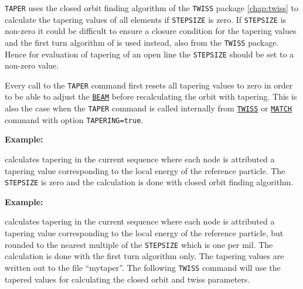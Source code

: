 \texttt{TAPER} uses the closed orbit finding algorithm of the
\texttt{TWISS} package \ref{chap:twiss} to calculate the
tapering values of all elements if \texttt{STEPSIZE} is zero.
If \texttt{STEPSIZE} is non-zero it could be difficult to ensure a
closure condition for the tapering values and the first turn algorithm
of \madx is used instead, also from the \texttt{TWISS} package. Hence
for evaluation of tapering of an open line the \texttt{STEPSIZE} should
be set to a non-zero value.  

Every call to the \texttt{TAPER} command first resets all tapering
values to zero in order to be able to adjust the
\hyperref[chap:beam]{\texttt{BEAM}} before recalculating the orbit with
tapering. This is also the case when the \texttt{TAPER} command is
called internally from \hyperref[chap:twiss]{\texttt{TWISS}} or
\hyperref[chap:match]{\texttt{MATCH}} command with option
\texttt{TAPERING=true}.  

\textbf{Example:}

calculates tapering in the current sequence where each node is
attributed a tapering value corresponding to the local energy of the
reference particle. The \texttt{STEPSIZE} is zero and the calculation is
done with closed orbit finding algorithm.


\textbf{Example:}

calculates tapering in the current sequence where each node is
attributed a tapering value corresponding to the local energy of the
reference particle, but rounded to the nearest multiple of the
\texttt{STEPSIZE} which is one per mil. The calculation is done with the
first turn algorithm only. The tapering values are written out to the
file ``mytaper''. The following \texttt{TWISS} command will use the
tapered values for calculating the closed orbit and twiss parameters. 



